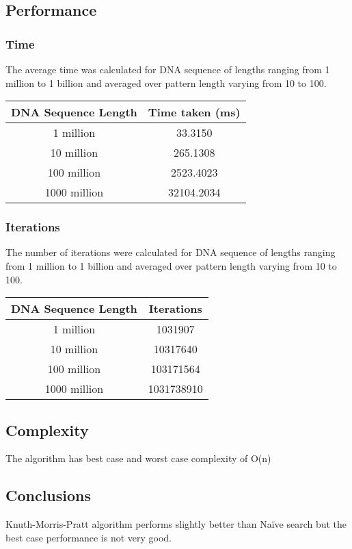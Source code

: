 \documentclass{article}
\begin{document}
\subsection{Performance}
\subsubsection{Time}
The average time was calculated for DNA sequence of lengths ranging from 1 million to 1 billion and averaged over pattern length varying from 10 to 100.
\noindent \begin{center}
\begin{tabular}{|c|c|}
\hline 
DNA Sequence Length & Time taken (ms)\tabularnewline
\hline 
\hline 
1 million & 33.3150\tabularnewline
\hline 
10 million & 265.1308\tabularnewline
\hline 
100 million & 2523.4023\tabularnewline
\hline 
1000 million & 32104.2034\tabularnewline
\hline 
\end{tabular}
\par\end{center}
\subsubsection{Iterations}
The number of iterations were calculated for DNA sequence of lengths ranging from 1 million to 1 billion and averaged over pattern length varying from 10 to 100.
\noindent \begin{center}
\begin{tabular}{|c|c|}
\hline 
DNA Sequence Length & Iterations\tabularnewline
\hline 
\hline 
1 million & 1031907\tabularnewline
\hline 
10 million & 10317640\tabularnewline
\hline 
100 million & 103171564\tabularnewline
\hline 
1000 million & 1031738910\tabularnewline
\hline 
\end{tabular}
\par\end{center}

\subsection{Complexity}
The algorithm has best case and worst case complexity of O(n)

\subsection{Conclusions}
Knuth-Morris-Pratt algorithm performs slightly better than Na\"ive search but the best case performance is not very good.
\end{document}
